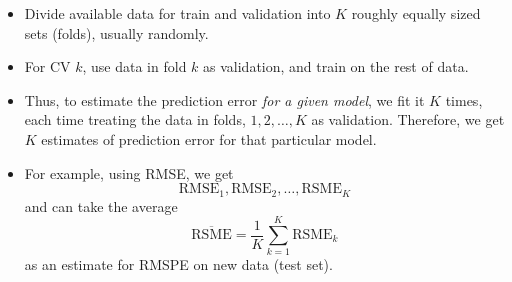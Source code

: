 \begin{itemize}
\begin{figure}[!ht]
          \end{figure}
          \begin{itemize}
              \item Divide available data for train and validation
                    into $ K $ roughly equally sized sets (folds),
                    usually randomly.
              \item For CV $ k $, use data in fold $ k $
                    as validation, and train on
                    the rest of data.
              \item Thus, to estimate the prediction error
                    \emph{for a given model}, we fit it $ K $ times, each
                    time treating the data in folds, $ 1,2,\ldots,K $
                    as validation.
                    Therefore, we get $ K $ estimates of prediction error
                    for that particular model.
              \item For example, using RMSE, we get
                    \[ \text{RMSE}_1,\text{RMSE}_2,\ldots,\text{RSME}_K \]
                    and can take the average
                    \[ \overline{\text{RSME}}=\frac{1}{K} \sum_{k=1}^{K}\text{RSME}_k \]
                    as an estimate for RMSPE on new data (test set).
          \end{itemize}
\end{itemize}
